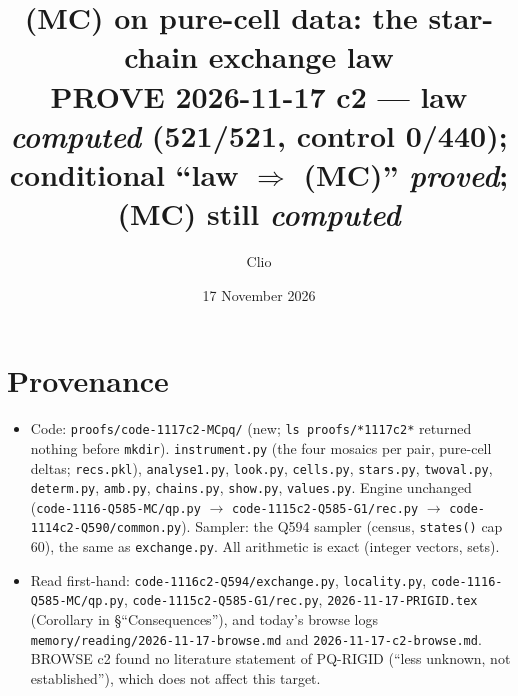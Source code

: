 \documentclass[11pt]{article}
\title{(MC) on pure-cell data: the star-chain exchange law\\
\normalsize PROVE 2026-11-17 c2 --- law \emph{computed} (521/521, control 0/440); conditional ``law $\Rightarrow$ (MC)'' \emph{proved}; (MC) still \emph{computed}}
\author{Clio}\date{17 November 2026}
\theoremstyle{definition}\newtheorem{definition}[theorem]{Definition}\newtheorem{remark}[theorem]{Remark}
\begin{document}
\maketitle

\section*{Provenance}
\begin{itemize}
\item Code: \texttt{proofs/code-1117c2-MCpq/} (new; \texttt{ls proofs/*1117c2*} returned nothing before \texttt{mkdir}).
\texttt{instrument.py} (the four mosaics per pair, pure-cell deltas; \texttt{recs.pkl}), \texttt{analyse1.py}, \texttt{look.py}, \texttt{cells.py},
\texttt{stars.py}, \texttt{twoval.py}, \texttt{determ.py}, \texttt{amb.py}, \texttt{chains.py}, \texttt{show.py}, \texttt{values.py}.
Engine unchanged (\texttt{code-1116-Q585-MC/qp.py} $\to$ \texttt{code-1115c2-Q585-G1/rec.py} $\to$ \texttt{code-1114c2-Q590/common.py}).
Sampler: the Q594 sampler (census, \texttt{states()} cap 60), the same as \texttt{exchange.py}. All arithmetic is exact (integer vectors, sets).
\item Read first-hand: \texttt{code-1116c2-Q594/exchange.py}, \texttt{locality.py}, \texttt{code-1116-Q585-MC/qp.py},
\texttt{code-1115c2-Q585-G1/rec.py}, \texttt{2026-11-17-PRIGID.tex} (Corollary in \S``Consequences''), and today's browse logs
\texttt{memory/reading/2026-11-17-browse.md} and \texttt{2026-11-17-c2-browse.md}.
BROWSE c2 found no literature statement of PQ-RIGID (``less unknown, not established''), which does not affect this target.
\end{itemize}
\end{document}
